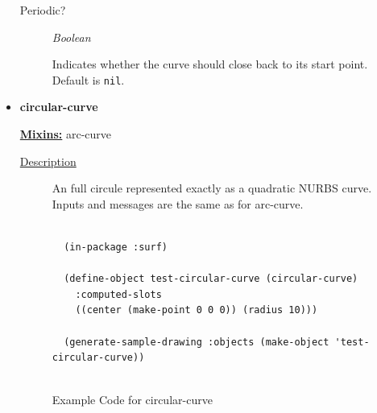 \documentclass [11pt]{book}
\begin{document}
\begin{itemize}
\begin{description}
\item [Periodic?]
\emph{Boolean}

 Indicates whether the curve should close back to its start point. Default is \texttt{nil}.




\end{description}







\item {}
\label{prim:circular-curve}
\textbf{circular-curve}


\textbf{
\underline{Mixins:}} arc-curve





\begin{description}

\item [
\underline{Description}]


An full circule represented exactly as a quadratic NURBS
    curve. Inputs and messages are the same as for arc-curve.



\end{description}




\begin{figure}
\begin{lrbox}{\boxedverb}
\begin{minipage}{\linewidth}
{\small

\begin{verbatim}

  (in-package :surf)

  (define-object test-circular-curve (circular-curve)
    :computed-slots
    ((center (make-point 0 0 0)) (radius 10)))

  (generate-sample-drawing :objects (make-object 'test-circular-curve))


\end{verbatim}}
\end{minipage}
\end{lrbox}
\fbox{\usebox{\boxedverb}}

\caption{Example Code for circular-curve}

\label{fig:example-code-circular-curve}

\end{figure}


\end{itemize}
\end{document}
